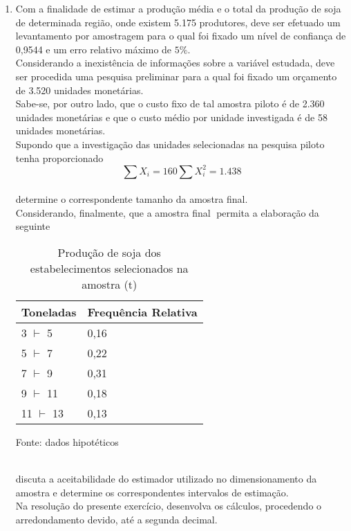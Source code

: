 \begin{enumerate}[resume]
\item Com a finalidade de estimar a produção média e o total da produção de soja de determinada região, onde existem 5.175 produtores, deve ser efetuado um levantamento por amostragem para o qual foi fixado um nível de confiança de 0,9544 e um erro
relativo máximo de $5\%$.\\
Considerando a inexistência de informações sobre a variável estudada, deve ser procedida uma pesquisa preliminar para a qual foi fixado um orçamento de 3.520 unidades monetárias.\\
Sabe-se, por outro lado, que o custo fixo de tal amostra piloto é de 2.360 unidades monetárias e que o custo médio por unidade investigada é de 58 unidades monetárias.\\
Supondo que a investigação das unidades selecionadas na pesquisa piloto tenha proporcionado \\
$$\sum X_{i} = 160  \sum X_{i}^{2} = 1.438$$\\
determine o correspondente tamanho da amostra final.\\
Considerando, finalmente, que a amostra final permita a elaboração da seguinte\\
	\begin{table}[!htb]
	\centering
	\caption{Produção de soja dos estabelecimentos selecionados na amostra (t)}
	\vspace{0.5cm}
	\begin{tabular}{ll}
	Toneladas & Frequência Relativa \\
	\hline 
	3 $\vdash$ 5 & 0,16  \\
	5 $\vdash$ 7 & 0,22  \\
	7 $\vdash$ 9 & 0,31  \\
	9 $\vdash$ 11 & 0,18  \\
	11 $\vdash$ 13 & 0,13  \\
	\end{tabular}
	 \newline \newline Fonte: dados hipotéticos
	\end{table}\\
discuta a aceitabilidade do estimador utilizado no dimensionamento da amostra e determine os correspondentes intervalos de estimação. \\
Na resolução do presente exercício, desenvolva os cálculos, procedendo o arredondamento devido, até a segunda decimal.


\end{enumerate}
